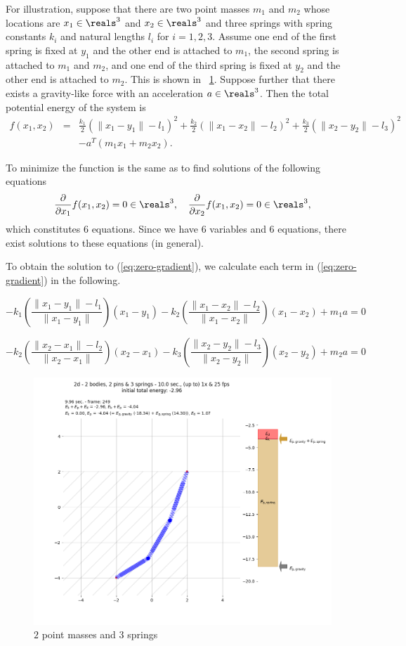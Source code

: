 \documentclass[12pt]{article}
\begin{document}
For illustration,
suppose that there are two point masses
$m_1$ and $m_2$ whose locations are $x_1\in\reals^3$ and $x_2\in\reals^3$
and three springs with spring constants $k_i$ and natural lengths $l_i$ for $i=1,2,3$.
Assume one end of the first spring is fixed at $y_1$ and the other end is attached to $m_1$,
the second spring is attached to $m_1$ and $m_2$,
and one end of the third spring is fixed at $y_2$ and the other end is attached to $m_2$.
This is shown in \figurename~\ref{fig:two-masses-and-three-springs}.
Suppose further that there exists a gravity-like force with an acceleration $a\in\reals^3$.
Then the total potential energy of the system is
\begin{eqnarray}
\nonumber
f(x_1,x_2)&=&
\frac{k_1}{2} (\|x_1-y_1\|-l_1)^2
+\frac{k_2}{2} (\|x_1-x_2\|-l_2)^2
+\frac{k_3}{2} (\|x_2-y_2\|-l_3)^2
\\
\label{eq:sum-of-potential-energies}
&&
-a^T(m_1x_1+m_2x_2).
\end{eqnarray}

To minimize the function
is the same as to find solutions of
the following equations
\begin{equation}
\label{eq:zero-gradient}
\frac{\partial}{\partial x_1} f(x_1,x_2) = 0 \in\reals^3,
\quad
\frac{\partial}{\partial x_2} f(x_1,x_2) = 0 \in\reals^3,
\end{equation}
which constitutes $6$ equations.
Since we have $6$ variables and $6$ equations,
there exist solutions to these equations (in general).

To obtain the solution to (\ref{eq:zero-gradient}),
we calculate each term in (\ref{eq:zero-gradient}) in the following.

\begin{equation}
\label{eq:force:1}
-k_1\left(\frac{\|x_1-y_1\| -l_1}{\|x_1-y_1\|}\right) (x_1-y_1)
-k_2\left(\frac{\|x_1-x_2\| -l_2}{\|x_1-x_2\|}\right) (x_1-x_2)
+ m_1 a
= 0
\end{equation}

\begin{equation}
\label{eq:force:2}
-k_2\left(\frac{\|x_2-x_1\| -l_2}{\|x_2-x_1\|}\right) (x_2-x_1)
-k_3\left(\frac{\|x_2-y_2\| -l_3}{\|x_2-y_2\|}\right) (x_2-y_2)
+ m_2 a
= 0
\end{equation}

\begin{figure}
\begin{center}
\includegraphics[trim=180 100 350 220, clip, width=.35\textwidth]{figures/2d-2-bodies-2-pins}
\end{center}
\caption{$2$ point masses and $3$ springs}
\label{fig:two-masses-and-three-springs}
\end{figure}
\end{document}
